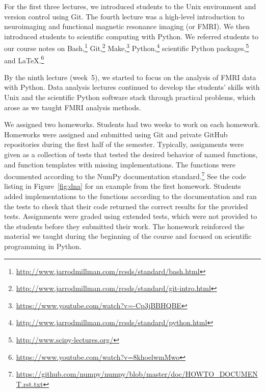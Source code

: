 For the first three lectures, we introduced students to the Unix environment
and version control using Git.
The fourth lecture was a high-level introduction to neuroimaging and
functional magnetic resonance imaging (or FMRI).
We then introduced students to scientific computing with Python.
We referred students to our course notes on
Bash,\footnote{\url{http://www.jarrodmillman.com/rcsds/standard/bash.html}}
Git,\footnote{\url{http://www.jarrodmillman.com/rcsds/standard/git-intro.html}}
Make,\footnote{\url{https://www.youtube.com/watch?v=-Cp3jBBHQBE}}
Python,\footnote{\url{http://www.jarrodmillman.com/rcsds/standard/python.html}}
scientific Python packages,\footnote{\url{http://www.scipy-lectures.org/}}
and \LaTeX.\footnote{\url{https://www.youtube.com/watch?v=8khoelwmMwo}}

By the ninth lecture (week~5), we started to focus on the analysis of FMRI data
with Python.
Data analysis lectures continued to develop the students' skills with
Unix and the scientific Python software stack through practical problems,
which arose as we taught FMRI analysis methods.

We assigned two homeworks.
Students had two weeks to work on each homework.
Homeworks were assigned and submitted using Git and private GitHub repositories during
the first half of the semester.
Typically, assignments were given as a collection of tests that tested the
desired behavior of named functions, and function templates with missing
implementations.
The functions were documented according to the NumPy documentation
standard.\footnote{\url{https://github.com/numpy/numpy/blob/master/doc/HOWTO_DOCUMENT.rst.txt}}
See the code listing in Figure~\ref{fig:dna} for an example from the first homework.
Students added implementations to the functions according to the documentation
and ran the tests to check that their code returned the correct results
for the provided tests.
Assignments were graded using extended tests, which were not provided to
the students before they submitted their work.
The homework reinforced the material we taught during the
beginning of the course and focused on scientific programming
in Python.


